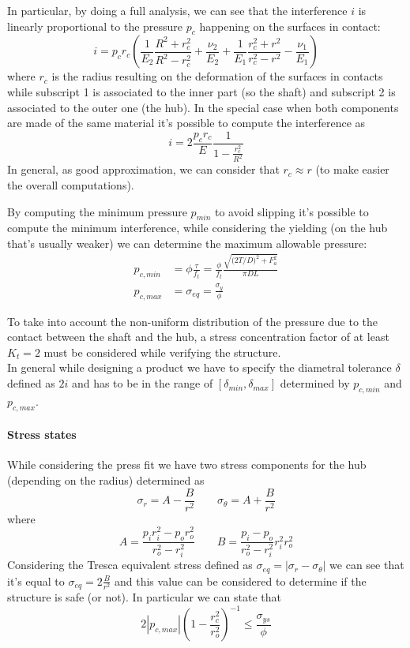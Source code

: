 \begin{multicols}
		In particular, by doing a full analysis, we can see that the interference $i$ is linearly proportional to the pressure $p_c$ happening on the surfaces in contact:
		\[ i = p_c r_c \left( \frac 1 {E_2} \frac{R^2+r_c^2}{R^2-r_c^2} + \frac{\nu_2}{E_2} + \frac{1}{E_1}  \frac{r_c^2 + r^2}{r_c^2 - r^2} - \frac{\nu_1}{E_1}\right) \]
		where $r_c$ is the radius resulting on the deformation of the surfaces in contacts while subscript 1 is associated to the inner part (so the shaft) and subscript 2 is associated to the outer one (the hub). In the special case when both components are made of the same material it's possible to compute the interference as
		\[ i = 2 \frac{p_c r_c}{E} \frac 1 {1-\frac{r_c^2}{R^2}} \]		
		In general, as good approximation, we can consider that $r_c \approx r$ (to make easier the overall computations).
		
		By computing the minimum pressure $p_{min}$ to avoid slipping it's possible to compute the minimum interference, while considering the yielding (on the hub that's usually weaker) we can determine the maximum allowable pressure:
		\begin{equation}
		\begin{split}
			p_{c,min} & = \phi \frac \tau {f_t} = \frac{\phi}{f_t} \frac{\sqrt{\big(2 T/D\big)^2 + F_a^2}}{\pi DL} \\
			p_{c,max} & = \sigma_{eq} = \frac{\sigma_y}{\phi}
		\end{split}
		\end{equation}
		
		To take into account the non-uniform distribution of the pressure due to the contact between the shaft and the hub, a stress concentration factor of at least $K_t = 2$ must be considered while verifying the structure.\\
		In general while designing a product we have to specify the diametral tolerance $\delta$ defined as $2i$ and has to be in the range of $[\delta_{min},\delta_{max}]$ determined by $p_{c,min}$ and $p_{c,max}$.
		
		\paragraph{Stress states} While considering the press fit we have two stress components for the hub (depending on the radius) determined as
		\[ \sigma_r = A - \frac{B}{r^2} \qquad \sigma_\theta= A + \frac B{r^2}  \]
		where
		\[ A = \frac{p_i r_i^2 - p_or_o^2}{r_o^2-r_i^2} \qquad B = \frac{p_i-p_o}{r_o^2-r_i^2} r_i^2r_o^2 \]
		Considering the Tresca equivalent stress defined as $\sigma_{eq} = |\sigma_r - \sigma_\theta|$ we can see that it's equal to $\sigma_{eq} = 2 \frac B{r^2}$ and this value can be considered to determine if the structure is safe (or not). In particular we can state that
		\[ 2 |p_{c,max}| \left( 1 - \frac{r_c^2}{r_o^2} \right)^{-1} \leq \frac{\sigma_{ys}}{\phi} \]
		

\end{multicols}
